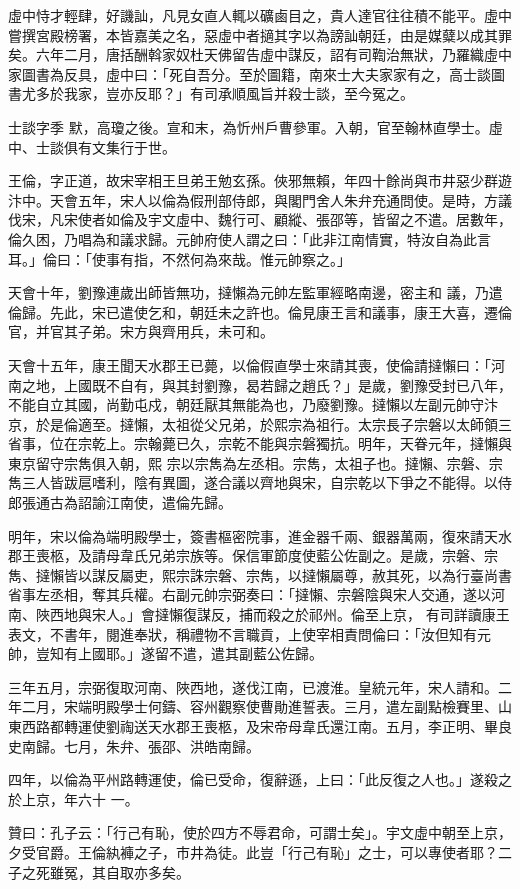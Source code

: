 \begin{pinyinscope}
 虛中恃才輕肆，好譏訕，凡見女直人輒以礦鹵目之，貴人達官往往積不能平。虛中嘗撰宮殿榜署，本皆嘉美之名，惡虛中者擿其字以為謗訕朝廷，由是媒糵以成其罪矣。六年二月，唐括酬斡家奴杜天佛留告虛中謀反，詔有司鞫治無狀，乃羅織虛中家圖書為反具，虛中曰：「死自吾分。至於圖籍，南來士大夫家家有之，高士談圖書尤多於我家，豈亦反耶？」有司承順風旨并殺士談，至今冤之。



 士談字季
 默，高瓊之後。宣和末，為忻州戶曹參軍。入朝，官至翰林直學士。虛中、士談俱有文集行于世。



 王倫，字正道，故宋宰相王旦弟王勉玄孫。俠邪無賴，年四十餘尚與市井惡少群遊汴中。天會五年，宋人以倫為假刑部侍郎，與閣門舍人朱弁充通問使。是時，方議伐宋，凡宋使者如倫及宇文虛中、魏行可、顧縱、張邵等，皆留之不遣。居數年，倫久困，乃唱為和議求歸。元帥府使人謂之曰：「此非江南情實，特汝自為此言耳。」倫曰：「使事有指，不然何為來哉。惟元帥察之。」



 天會十年，劉豫連歲出師皆無功，撻懶為元帥左監軍經略南邊，密主和
 議，乃遣倫歸。先此，宋已遣使乞和，朝廷未之許也。倫見康王言和議事，康王大喜，遷倫官，并官其子弟。宋方與齊用兵，未可和。



 天會十五年，康王聞天水郡王已薨，以倫假直學士來請其喪，使倫請撻懶曰：「河南之地，上國既不自有，與其封劉豫，曷若歸之趙氏？」是歲，劉豫受封已八年，不能自立其國，尚勤屯戍，朝廷厭其無能為也，乃廢劉豫。撻懶以左副元帥守汴京，於是倫適至。撻懶，太祖從父兄弟，於熙宗為祖行。太宗長子宗磐以太師領三省事，位在宗乾上。宗翰薨已久，宗乾不能與宗磐獨抗。明年，天眷元年，撻懶與東京留守宗雋俱入朝，熙
 宗以宗雋為左丞相。宗雋，太祖子也。撻懶、宗磐、宗雋三人皆跋扈嗜利，陰有異圖，遂合議以齊地與宋，自宗乾以下爭之不能得。以侍郎張通古為詔諭江南使，遣倫先歸。



 明年，宋以倫為端明殿學士，簽書樞密院事，進金器千兩、銀器萬兩，復來請天水郡王喪柩，及請母韋氏兄弟宗族等。保信軍節度使藍公佐副之。是歲，宗磐、宗雋、撻懶皆以謀反屬吏，熙宗誅宗磐、宗雋，以撻懶屬尊，赦其死，以為行臺尚書省事左丞相，奪其兵權。右副元帥宗弼奏曰：「撻懶、宗磐陰與宋人交通，遂以河南、陜西地與宋人。」會撻懶復謀反，捕而殺之於祁州。倫至上京，
 有司詳讀康王表文，不書年，閱進奉狀，稱禮物不言職貢，上使宰相責問倫曰：「汝但知有元帥，豈知有上國耶。」遂留不遣，遣其副藍公佐歸。



 三年五月，宗弼復取河南、陜西地，遂伐江南，已渡淮。皇統元年，宋人請和。二年二月，宋端明殿學士何鑄、容州觀察使曹勛進誓表。三月，遣左副點檢賽里、山東西路都轉運使劉祹送天水郡王喪柩，及宋帝母韋氏還江南。五月，李正明、畢良史南歸。七月，朱弁、張邵、洪皓南歸。



 四年，以倫為平州路轉運使，倫已受命，復辭遜，上曰：「此反復之人也。」遂殺之於上京，年六十
 一。



 贊曰：孔子云：「行己有恥，使於四方不辱君命，可謂士矣」。宇文虛中朝至上京，夕受官爵。王倫紈褲之子，市井為徒。此豈「行己有恥」之士，可以專使者耶？二子之死雖冤，其自取亦多矣。



\end{pinyinscope}